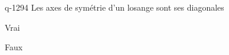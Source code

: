 \begin{truefalse}{q-1294}
Les axes de symétrie d'un losange sont ses diagonales
\item Vrai
\item* Faux
\end{truefalse}

